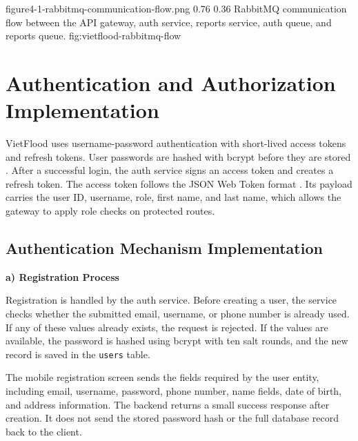 \vfplaceholderfigure
    {figure4-1-rabbitmq-communication-flow.png}
    {0.76}
    {0.36}
    {RabbitMQ communication flow between the API gateway, auth service, reports service, auth queue, and reports queue.}
    {fig:vietflood-rabbitmq-flow}

\section{Authentication and Authorization Implementation}

VietFlood uses username-password authentication with short-lived access tokens and refresh tokens. User passwords are hashed with bcrypt before they are stored \cite{provos1999bcrypt}. After a successful login, the auth service signs an access token and creates a refresh token. The access token follows the JSON Web Token format \cite{jones2015jwt}. Its payload carries the user ID, username, role, first name, and last name, which allows the gateway to apply role checks on protected routes.

\subsection{Authentication Mechanism Implementation}

\textbf{a) Registration Process}

Registration is handled by the auth service. Before creating a user, the service checks whether the submitted email, username, or phone number is already used. If any of these values already exists, the request is rejected. If the values are available, the password is hashed using bcrypt with ten salt rounds, and the new record is saved in the \texttt{users} table.

The mobile registration screen sends the fields required by the user entity, including email, username, password, phone number, name fields, date of birth, and address information. The backend returns a small success response after creation. It does not send the stored password hash or the full database record back to the client.

